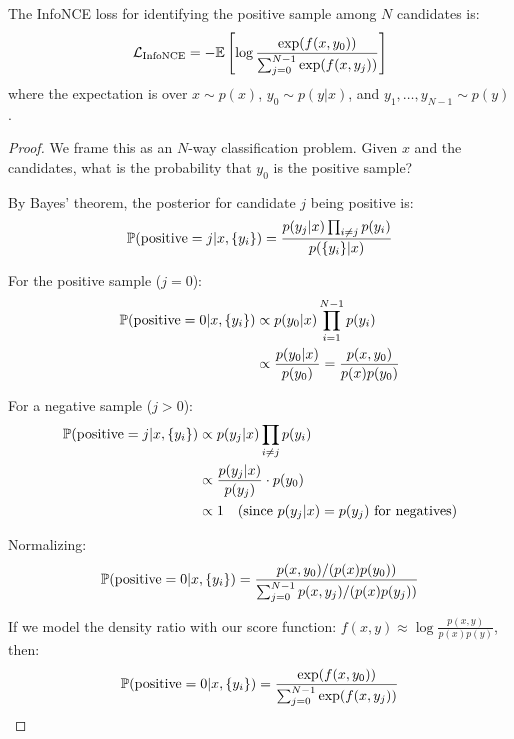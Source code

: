 \begin{notechapter}
\begin{theorem}
\label{contrastive-rigorous:thm:infonce}
The InfoNCE loss for identifying the positive sample among $N$ candidates is:
\begin{equation}
\mathcal{L}_{\text{InfoNCE}} = -\mathbb{E}\left[\log \frac{\exp(f(x, y_0))}{\sum_{j=0}^{N-1} \exp(f(x, y_j))}\right]
\end{equation}
where the expectation is over $x \sim p(x)$, $y_0 \sim p(y|x)$, and $y_1, \ldots, y_{N-1} \sim p(y)$.
\end{theorem}

\begin{proof}
We frame this as an $N$-way classification problem. Given $x$ and the candidates, what is the probability that $y_0$ is the positive sample?

By Bayes' theorem, the posterior for candidate $j$ being positive is:
\begin{equation}
\mathbb{P}(\text{positive} = j | x, \{y_i\}) = \frac{p(y_j | x) \prod_{i \neq j} p(y_i)}{p(\{y_i\} | x)}
\end{equation}

For the positive sample ($j = 0$):
\begin{align}
\mathbb{P}(\text{positive} = 0 | x, \{y_i\}) &\propto p(y_0 | x) \prod_{i=1}^{N-1} p(y_i) \\
&\propto \frac{p(y_0 | x)}{p(y_0)} = \frac{p(x, y_0)}{p(x)p(y_0)}
\end{align}

For a negative sample ($j > 0$):
\begin{align}
\mathbb{P}(\text{positive} = j | x, \{y_i\}) &\propto p(y_j | x) \prod_{i \neq j} p(y_i) \\
&\propto \frac{p(y_j | x)}{p(y_j)} \cdot p(y_0)  \\
&\propto 1 \quad \text{(since } p(y_j|x) = p(y_j) \text{ for negatives)}
\end{align}

Normalizing:
\begin{equation}
\mathbb{P}(\text{positive} = 0 | x, \{y_i\}) = \frac{p(x, y_0) / (p(x)p(y_0))}{\sum_{j=0}^{N-1} p(x, y_j) / (p(x)p(y_j))}
\end{equation}

If we model the density ratio with our score function: $f(x, y) \approx \log \frac{p(x,y)}{p(x)p(y)}$, then:
\begin{equation}
\mathbb{P}(\text{positive} = 0 | x, \{y_i\}) = \frac{\exp(f(x, y_0))}{\sum_{j=0}^{N-1} \exp(f(x, y_j))}
\end{equation}


\end{proof}
\end{notechapter}
